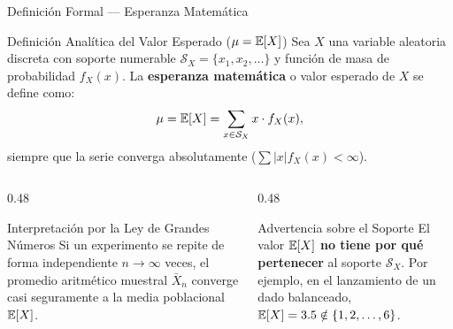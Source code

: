 \documentclass[10pt, aspectratio=169]{beamer}
\begin{document}
\begin{frame}{Definición Formal — Esperanza Matemática}
  \begin{block}{Definición Analítica del Valor Esperado ($\mu = \mathbb{E}[X]$)}
    \footnotesize
    Sea $X$ una variable aleatoria discreta con soporte numerable $\mathcal{S}_X = \{x_1, x_2, \dots\}$ y función de masa de probabilidad $f_X(x)$. La \textbf{esperanza matemática} o valor esperado de $X$ se define como:
    $$\mu = \mathbb{E}[X] = \sum_{x \in \mathcal{S}_X} x \cdot f_X(x),$$
    siempre que la serie converga absolutamente ($\sum |x| f_X(x) < \infty$).
  \end{block}
  \vspace{-0.05cm}
  \pause
  \begin{columns}[T]
    \begin{column}{0.48\textwidth}
      \begin{exampleblock}{Interpretación por la Ley de Grandes Números}
        \footnotesize
        Si un experimento se repite de forma independiente $n \to \infty$ veces, el promedio aritmético muestral $\bar{X}_n$ converge casi seguramente a la media poblacional $\mathbb{E}[X]$.
      \end{exampleblock}
    \end{column}
    \begin{column}{0.48\textwidth}
      \begin{alertblock}{Advertencia sobre el Soporte}
        \footnotesize
        El valor $\mathbb{E}[X]$ \textbf{no tiene por qué pertenecer} al soporte $\mathcal{S}_X$. Por ejemplo, en el lanzamiento de un dado balanceado, $\mathbb{E}[X] = 3.5 \notin \{1, 2, \dots, 6\}$.
      \end{alertblock}
    \end{column}
  \end{columns}
\end{frame}
\end{document}
